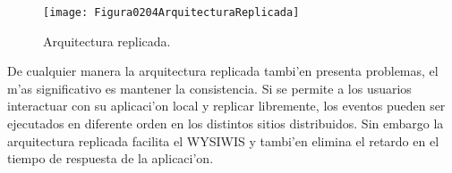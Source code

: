 \begin{figure}[ht]
    \centering
    \texttt{[image: Figura0204ArquitecturaReplicada]}
    \caption{Arquitectura replicada. }
    \cite{lauwers1990replicated}
    \label{fig:ArquitecturaReplicada}
\end{figure}
\medskip

De cualquier manera la arquitectura replicada tambi'en presenta problemas, el m'as significativo es mantener la consistencia. Si se permite a los usuarios interactuar con su aplicaci'on local y replicar libremente, los eventos pueden ser ejecutados en diferente orden en los distintos sitios distribuidos. Sin embargo la arquitectura replicada facilita el WYSIWIS y tambi'en elimina el retardo en el tiempo de respuesta de la aplicaci'on.
